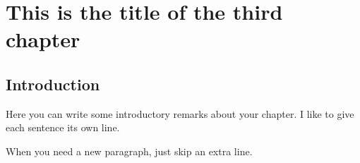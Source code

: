	\chapter{This is the title of the third chapter}
	\newpage


\section{Introduction}

Here you can write some introductory remarks about your chapter.
I like to give each sentence its own line.

When you need a new paragraph, just skip an extra line.


\begin{comment}
	
	{}

	\begin{appendices}
	  \chapter{Appendix to Chapter 3}
	  
	\end{appendices}

	
\end{comment}
